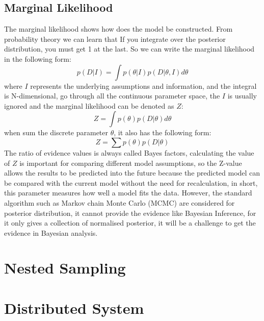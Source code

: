 \documentclass[11pt]{book}
\begin{document}
\subsection{Marginal Likelihood}
The marginal likelihood shows how does the model be constructed.
From probability theory we can learn that If you integrate over the posterior distribution, you must get 1 at the last. 
So we can write the marginal likelihood in the following form:
\begin{equation}
	p(D|I) = \int p(\theta|I)p(D|\theta, I)d\theta
\end{equation}
where $I$ represents the underlying assumptions and information, and the integral is N-dimensional, go through all the continuous parameter space, the $I$ is 
usually ignored and the marginal likelihood can be denoted as $Z$:
\begin{equation}
	Z = \int p(\theta)p(D|\theta)d\theta
\end{equation}
when sum the discrete parameter $\theta$, it also has the following form:
\begin{equation}
	Z = \sum p(\theta)p(D|\theta)
\end{equation}
The ratio of evidence values is always called Bayes factors, calculating the value of $Z$ 
is important for comparing different model assumptions, so the Z-value allows the results to be predicted into the future 
because the predicted model can be compared with the current model without the need for recalculation, in short, this parameter measures how well a model fits the data.
However, the standard algorithm such as Markov chain Monte Carlo (MCMC) are considered for posterior distribution, it cannot provide the evidence like Bayesian Inference,
for it only gives a collection of normalised posterior, it will be a challenge to get the evidence in Bayesian analysis.


\section{Nested Sampling} 
\section{Distributed System}
\end{document}

